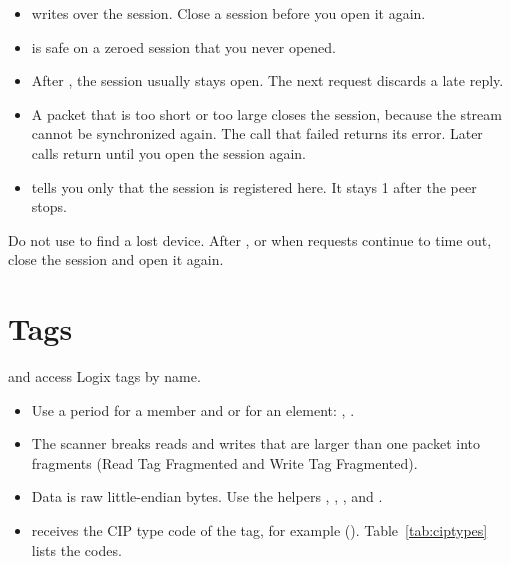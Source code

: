 \begin{itemize}
  \item {} writes over the session. Close a session
        before you open it again.
  \item {} is safe on a zeroed session that you
        never opened.
  \item After , the session usually stays open. The
        next request discards a late reply.
  \item A packet that is too short or too large closes the session, because
        the stream cannot be synchronized again. The call that failed returns
        its error. Later calls return  until you open the
        session again.
  \item {} tells you only that the session is
        registered here. It stays 1 after the peer stops.
\end{itemize}

\begin{caution}
Do not use  to find a lost device. After
, or when requests continue to time out, close the session
and open it again.
\end{caution}

\section{Tags}\label{sec:tags}

 and  access Logix tags by name.

\begin{itemize}
  \item Use a period for a member and \code{[n]} or \code{[n,m]} for an
        element: , .
  \item The scanner breaks reads and writes that are larger than one packet
        into fragments (Read Tag Fragmented and Write Tag Fragmented).
  \item Data is raw little-endian bytes. Use the helpers
        , , , and
        .
  \item {} receives the CIP type code of the tag, for example
         (). Table~\ref{tab:ciptypes} lists the codes.
\end{itemize}

